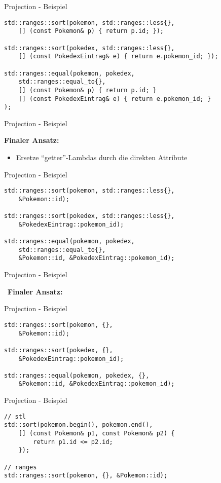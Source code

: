 \begin{frame}[fragile]{Projection - Beispiel}
    \begin{verbatim}
std::ranges::sort(pokemon, std::ranges::less{},
    [] (const Pokemon& p) { return p.id; });

std::ranges::sort(pokedex, std::ranges::less{},
    [] (const PokedexEintrag& e) { return e.pokemon_id; });

std::ranges::equal(pokemon, pokedex,
    std::ranges::equal_to{},
    [] (const Pokemon& p) { return p.id; }
    [] (const PokedexEintrag& e) { return e.pokemon_id; }
);
    \end{verbatim}
\end{frame}

\begin{frame}{Projection - Beispiel}
    \begin{center}
        \textbf{Finaler Ansatz:}
    \end{center}

    \begin{itemize}
        \item Ersetze \enquote{getter}-Lambdas durch die direkten Attribute
    \end{itemize}
\end{frame}

\begin{frame}[fragile]{Projection - Beispiel}
    \begin{verbatim}
std::ranges::sort(pokemon, std::ranges::less{},
    &Pokemon::id);

std::ranges::sort(pokedex, std::ranges::less{},
    &PokedexEintrag::pokemon_id);

std::ranges::equal(pokemon, pokedex,
    std::ranges::equal_to{},
    &Pokemon::id, &PokedexEintrag::pokemon_id);
    \end{verbatim}
\end{frame}

\begin{frame}{Projection - Beispiel}
    \begin{center}
        \SixStar \ \textbf{Finaler Ansatz:} \SixStar
    \end{center}
\end{frame}

\begin{frame}[fragile]{Projection - Beispiel}
    \begin{verbatim}
std::ranges::sort(pokemon, {},
    &Pokemon::id);

std::ranges::sort(pokedex, {},
    &PokedexEintrag::pokemon_id);

std::ranges::equal(pokemon, pokedex, {},
    &Pokemon::id, &PokedexEintrag::pokemon_id);
    \end{verbatim}
\end{frame}

\begin{frame}[fragile]{Projection - Beispiel}
    \begin{verbatim}
// stl
std::sort(pokemon.begin(), pokemon.end(),
    [] (const Pokemon& p1, const Pokemon& p2) {
        return p1.id <= p2.id;
    });

// ranges
std::ranges::sort(pokemon, {}, &Pokemon::id);
    \end{verbatim}
\end{frame}